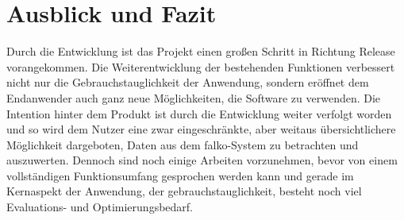 \chapter{Ausblick und Fazit}
Durch die Entwicklung ist das Projekt einen großen Schritt in Richtung Release vorangekommen. Die Weiterentwicklung der bestehenden Funktionen verbessert nicht nur die Gebrauchstauglichkeit der Anwendung, sondern eröffnet dem Endanwender auch ganz neue Möglichkeiten, die Software zu verwenden.
Die Intention hinter dem Produkt ist durch die Entwicklung weiter verfolgt worden und so wird dem Nutzer eine zwar eingeschränkte, aber weitaus übersichtlichere Möglichkeit dargeboten, Daten aus dem \gls{falko}-System zu betrachten und auszuwerten.
Dennoch sind noch einige Arbeiten vorzunehmen, bevor von einem vollständigen Funktionsumfang gesprochen werden kann und gerade im Kernaspekt der Anwendung, der \gls{gebrauchstauglichkeit}, besteht noch viel Evaluations- und Optimierungsbedarf.
